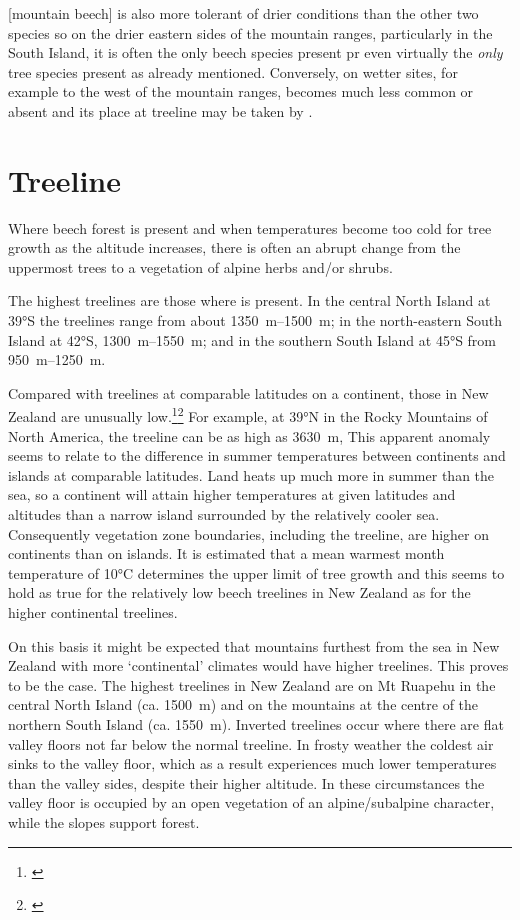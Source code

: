 [mountain beech] is also more tolerant of drier conditions than the other two species so on the drier eastern sides of the mountain ranges, particularly in the South Island, it is often the only beech species present pr even virtually the \emph{only} tree species present as already mentioned.
Conversely, on wetter sites, for example to the west of the mountain ranges,  becomes much less common or absent and its place at treeline may be taken by .

\section{Treeline}

Where beech forest is present and when temperatures become too cold for tree growth as the altitude increases, there is often an abrupt change from the uppermost trees to a vegetation of alpine herbs and/or shrubs.

The highest treelines are those where  is present.
In the central North Island at \ang{39}S the  treelines range from about \SIrange{1350}{1500}{\metre}; in the north-eastern South Island at \ang{42}S, \SIrange{1300}{1550}{\metre}; and in the southern South Island at \ang{45}S from \SIrange{950}{1250}{\metre}.

Compared with treelines at comparable latitudes on a continent, those in New Zealand are unusually low.\footnote{\cite{wardle1965comparison}}\footnote{\cite{wardle1971explanation}} For example, at \ang{39}N in the Rocky Mountains of North America, the treeline can be as high as \SI{3630}{\metre}, This apparent anomaly seems to relate to the difference in summer temperatures between continents and islands at comparable latitudes.
Land heats up much more in summer than the sea, so a continent will attain higher temperatures at given latitudes and altitudes than a narrow island surrounded by the relatively cooler sea.
Consequently vegetation zone boundaries, including the treeline, are higher on continents than on islands.
It is estimated that a mean warmest month temperature of \ang{10}C determines the upper limit of tree growth and this seems to hold as true for the relatively low beech treelines in New Zealand as for the higher continental treelines.

On this basis it might be expected that mountains furthest from the sea in New Zealand with more `continental' climates would have higher treelines.
This proves to be the case.
The highest treelines in New Zealand are on Mt Ruapehu in the central North Island (ca. \SI{1500}{\metre}) and on the mountains at the centre of the northern South Island (ca. \SI{1550}{\metre}).
Inverted treelines occur where there are flat valley floors not far below the normal treeline.
In frosty weather the coldest air sinks to the valley floor, which as a result experiences much lower temperatures than the valley sides, despite their higher altitude.
In these circumstances the valley floor is occupied by an open vegetation of an alpine/subalpine character, while the slopes support forest.

